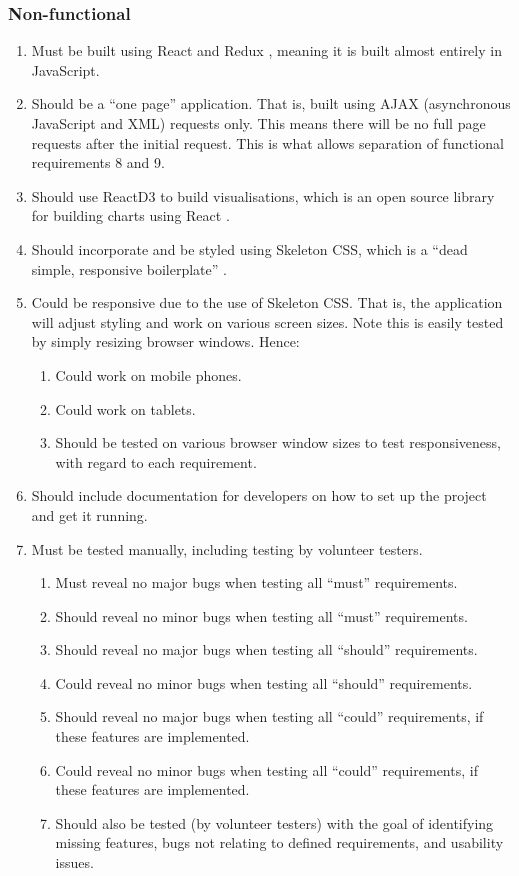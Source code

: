 \documentclass[11pt,openright,a4paper]{report}
\begin{document}
\subsubsection{Non-functional}
\begin{enumerate}
\item Must be built using React \parencite{react} and Redux \parencite{redux}, meaning it is built almost entirely in JavaScript.
\item Should be a \enquote{one page} application. That is, built using AJAX (asynchronous JavaScript and XML) requests only. This means there will be no full page requests after the initial request. This is what allows separation of functional requirements 8 and 9.
\item Should use ReactD3 to build visualisations, which is an open source library for building charts using React \parencite{reactd3}.
\item Should incorporate and be styled using Skeleton CSS, which is a \enquote{dead simple, responsive boilerplate} \parencite{skeletoncss}.
\item Could be responsive due to the use of Skeleton CSS. That is, the application will adjust styling and work on various screen sizes. Note this is easily tested by simply resizing browser windows. Hence:
  \begin{enumerate}
  \item Could work on mobile phones.
  \item Could work on tablets.
  \item Should be tested on various browser window sizes to test responsiveness, with regard to each requirement.
  \end{enumerate}
\item Should include documentation for developers on how to set up the project and get it running.
\item Must be tested manually, including testing by volunteer testers.
  \begin{enumerate}
  \item Must reveal no major bugs when testing all \enquote{must} requirements.
  \item Should reveal no minor bugs when testing all \enquote{must} requirements.
  \item Should reveal no major bugs when testing all \enquote{should} requirements.
  \item Could reveal no minor bugs when testing all \enquote{should} requirements.
  \item Should reveal no major bugs when testing all \enquote{could} requirements, if these features are implemented.
  \item Could reveal no minor bugs when testing all \enquote{could} requirements, if these features are implemented.
  \item Should also be tested (by volunteer testers) with the goal of identifying missing features, bugs not relating to defined requirements, and usability issues.
  \end{enumerate}
\end{enumerate}
\end{document}
